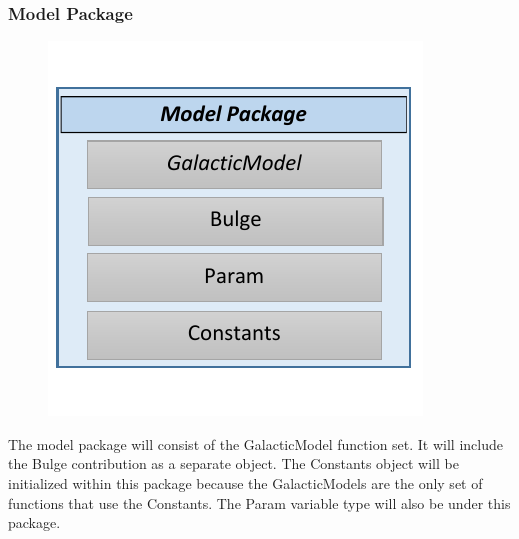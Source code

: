 \documentclass[titlepage]{article}
\begin{document}
\subsubsection{Model Package}
\begin{minipage}{\textwidth}
\begin{figure}
  \vspace{-20pt}
  \begin{center}
	\includegraphics{model_package.pdf}
  \end{center}
\end{figure}
The model package will consist of the GalacticModel function set. It will include the Bulge contribution as a separate object. The Constants object will be initialized within this package because the GalacticModels are the only set of functions that use the Constants. The Param variable type will also be under this package. 
\end{minipage}

\vspace{+100pt}
\end{document}
